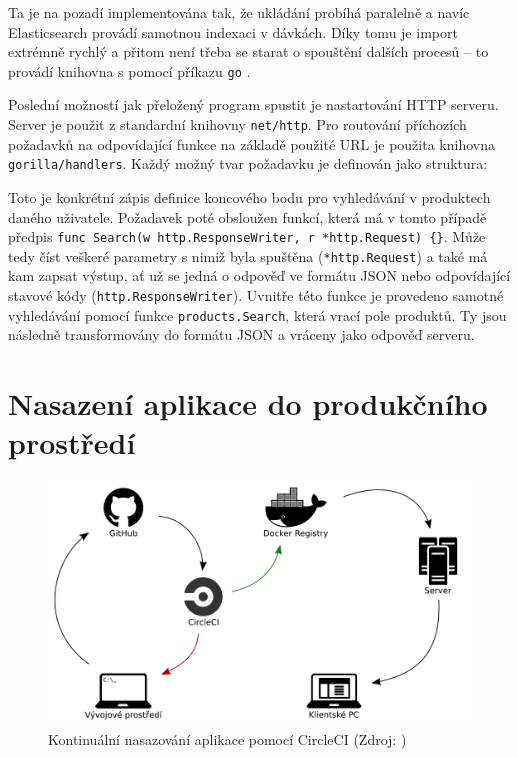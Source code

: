 \documentclass[FM,DP]{tulthesis}
\begin{document}
Ta je na pozadí implementována tak, že ukládání probíhá paralelně a navíc Elasticsearch 
provádí samotnou indexaci v dávkách. Díky tomu je import extrémně rychlý a přitom 
není třeba se starat o spouštění dalších procesů -- to provádí knihovna s pomocí
příkazu \verb|go| \cite{go-concurrency}.

Poslední možností jak přeložený program spustit je nastartování HTTP serveru. Server
je použit z standardní knihovny \verb|net/http|. Pro routování příchozích požadavků
na odpovídající funkce na základě použité URL je použita knihovna \verb|gorilla/handlers|.
Každý možný tvar požadavku je definován jako struktura:

Toto je konkrétní zápis definice koncového bodu pro vyhledávání v produktech daného uživatele.
Požadavek poté obsloužen funkcí, která má v tomto případě předpis 
\verb|func Search(w http.ResponseWriter, r *http.Request) {}|. Může tedy číst veškeré
parametry s nimiž byla spuštěna (\verb|*http.Request|) a také má kam zapsat
výstup, ať už se jedná o odpověď ve formátu JSON nebo odpovídající stavové kódy 
(\verb|http.ResponseWriter|). Uvnitře této funkce je provedeno samotné vyhledávání
pomocí funkce \verb|products.Search|, která vrací pole produktů. Ty jsou následně transformovány
do formátu JSON a vráceny jako odpověď serveru.

\section{Nasazení aplikace do produkčního prostředí}

\begin{figure}[h]
\center
\includegraphics[width=\textwidth]{circleci.pdf}
\caption[Kontinuální nasazování aplikace]{Kontinuální nasazování aplikace pomocí CircleCI (Zdroj: \cite{circleci})}
\label{circle-ci}
\end{figure}
\end{document}
